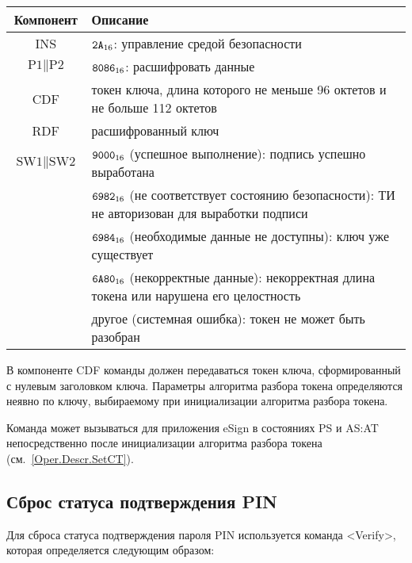 \noindent
\begin{tabular}{|c|p{14cm}|}
\hline
Компонент & Описание\\ 
\hline
\hline
INS & $\texttt{2A}_{16}$: управление средой безопасности \\
\hline
$\text{P1} \parallel \text{P2}$ & $\texttt{8086}_{16}$: расшифровать
данные \\ 
\hline
CDF & токен ключа, длина которого не
меньше 96 октетов и не больше 112 октетов\\
\hline \hline
RDF &  расшифрованный ключ \\
\hline
$\text{SW1} \parallel \text{SW2}$ & $\texttt{9000}_{16}$ 
(успешное выполнение): подпись успешно выработана \\
 & $\texttt{6982}_{16}$ (не соответствует состоянию безопасности): ТИ не 
авторизован для выработки подписи\\
 & $\texttt{6984}_{16}$ (необходимые данные не доступны): ключ уже существует\\
 & $\texttt{6A80}_{16}$ (некорректные данные): некорректная длина токена или 
нарушена его целостность\\
 & другое (системная ошибка): токен не может быть разобран\\
\hline
\end{tabular}

В компоненте CDF команды должен передаваться токен ключа, 
сформированный с нулевым заголовком ключа. 
Параметры алгоритма разбора токена определяются неявно
по ключу, выбираемому при инициализации алгоритма
разбора токена. 

Команда может вызываться для приложения eSign в состояниях 
PS и AS:AT непосредственно после инициализации алгоритма 
разбора токена (см.~\ref{Oper.Descr.SetCT}).


\subsection{Сброс статуса подтверждения PIN}
\label{Oper.Descr.VerifyDeauth}

Для сброса статуса подтверждения пароля PIN
используется команда <Verify>,
которая определяется следующим образом:

